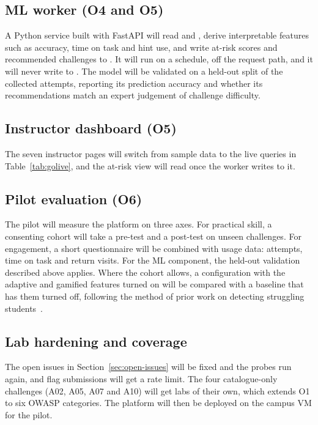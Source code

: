 
\subsection{ML worker (O4 and O5)}

A Python service built with FastAPI will read  and , derive interpretable features such as accuracy, time on task and hint use, and write at-risk scores and recommended challenges to . It will run on a schedule, off the request path, and it will never write to . The model will be validated on a held-out split of the collected attempts, reporting its prediction accuracy and whether its recommendations match an expert judgement of challenge difficulty.

\subsection{Instructor dashboard (O5)}

The seven instructor pages will switch from sample data to the live queries in Table~\ref{tab:golive}, and the at-risk view will read  once the worker writes to it.

\subsection{Pilot evaluation (O6)}

The pilot will measure the platform on three axes. For practical skill, a consenting cohort will take a pre-test and a post-test on unseen challenges. For engagement, a short questionnaire will be combined with usage data: attempts, time on task and return visits. For the ML component, the held-out validation described above applies. Where the cohort allows, a configuration with the adaptive and gamified features turned on will be compared with a baseline that has them turned off, following the method of prior work on detecting struggling students~\cite{Svabensky2024detecting}.

\subsection{Lab hardening and coverage}

The open issues in Section~\ref{sec:open-issues} will be fixed and the probes run again, and flag submissions will get a rate limit. The four catalogue-only challenges (A02, A05, A07 and A10) will get labs of their own, which extends O1 to six OWASP categories. The platform will then be deployed on the campus VM for the pilot.
